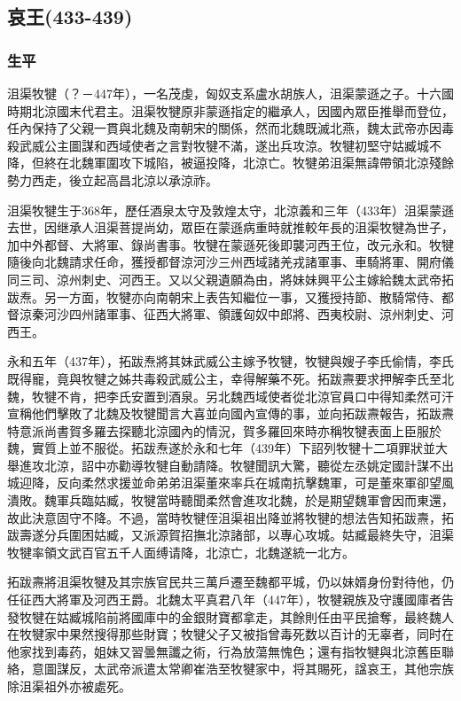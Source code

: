 
\subsection{哀王\tiny(433-439)}

\subsubsection{生平}

沮渠牧犍（？－447年），一名茂虔，匈奴支系盧水胡族人，沮渠蒙遜之子。十六國時期北涼國末代君主。沮渠牧犍原非蒙遜指定的繼承人，因國內眾臣推舉而登位，任內保持了父親一貫與北魏及南朝宋的關係，然而北魏既滅北燕，魏太武帝亦因毒殺武威公主圖謀和西域使者之言對牧犍不滿，遂出兵攻涼。牧犍初堅守姑臧城不降，但終在北魏軍圍攻下城陷，被逼投降，北涼亡。牧犍弟沮渠無諱帶領北涼殘餘勢力西走，後立起高昌北涼以承涼祚。

沮渠牧犍生于368年，歷任酒泉太守及敦煌太守，北涼義和三年（433年）沮渠蒙遜去世，因继承人沮渠菩提尚幼，眾臣在蒙遜病重時就推較年長的沮渠牧犍為世子，加中外都督、大將軍、錄尚書事。牧犍在蒙遜死後即襲河西王位，改元永和。牧犍隨後向北魏請求任命，獲授都督涼河沙三州西域諸羌戎諸軍事、車騎將軍、開府儀同三司、涼州刺史、河西王。又以父親遺願為由，將妹妹興平公主嫁給魏太武帝拓跋焘。另一方面，牧犍亦向南朝宋上表告知繼位一事，又獲授持節、散騎常侍、都督涼秦河沙四州諸軍事、征西大將軍、領護匈奴中郎將、西夷校尉、涼州刺史、河西王。

永和五年（437年），拓跋焘將其妹武威公主嫁予牧犍，牧犍與嫂子李氏偷情，李氏既得寵，竟與牧犍之姊共毒殺武威公主，幸得解藥不死。拓跋燾要求押解李氏至北魏，牧犍不肯，把李氏安置到酒泉。另北魏西域使者從北涼官員口中得知柔然可汗宣稱他們擊敗了北魏及牧犍聞言大喜並向國內宣傳的事，並向拓跋燾報告，拓跋燾特意派尚書賀多羅去探聽北涼國內的情況，賀多羅回來時亦稱牧犍表面上臣服於魏，實質上並不服從。拓跋焘遂於永和七年（439年）下詔列牧犍十二項罪狀並大舉進攻北涼，詔中亦勸導牧犍自動請降。牧犍聞訊大驚，聽從左丞姚定國計謀不出城迎降，反向柔然求援並命弟弟沮渠董來率兵在城南抗擊魏軍，可是董來軍卻望風潰敗。魏軍兵臨姑臧，牧犍當時聽聞柔然會進攻北魏，於是期望魏軍會因而東還，故此決意固守不降。不過，當時牧犍侄沮渠祖出降並將牧犍的想法告知拓跋燾，拓跋壽遂分兵圍困姑臧，又派源賀招撫北涼諸部，以專心攻城。姑臧最終失守，沮渠牧犍率領文武百官五千人面缚请降，北涼亡，北魏遂統一北方。

拓跋燾將沮渠牧犍及其宗族官民共三萬戶遷至魏都平城，仍以妹婿身份對待他，仍任征西大將軍及河西王爵。北魏太平真君八年（447年），牧犍親族及守護國庫者告發牧犍在姑臧城陷前將國庫中的金銀財寶都拿走，其餘則任由平民搶奪，最終魏人在牧犍家中果然搜得那些財寶；牧犍父子又被指曾毒死数以百计的无辜者，同时在他家找到毒药，姐妹又習曇無讖之術，行為放蕩無愧色；還有指牧犍與北涼舊臣聯絡，意圖謀反，太武帝派遣太常卿崔浩至牧犍家中，将其賜死，諡哀王，其他宗族除沮渠祖外亦被處死。

